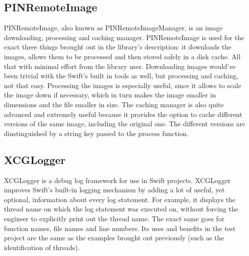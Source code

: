 \documentclass[a4paper,12pt]{article}
\begin{document}
\subsection{PINRemoteImage}
PINRemoteImage, also known as PINRemoteImageManager, is an image downloading, processing and caching manager.\cite{PINRemoteImage}
PINRemoteImage is used for the exact three things brought out in the library's description: it downloads the images,
allows them to be processed and then stored safely in a disk cache. All that with minimal
effort from the library user. Downloading images would've been trivial with the Swift's built in tools as well, but
processing and caching, not that easy. Processing the images is especially useful, since it allows to scale the image
down if necessary, which in turn makes the image smaller in dimensions and the file smaller in size. The caching
manager is also quite advanced and extremely useful because it provides the option to cache different versions of
the same image, including the original one. The different versions are dinstinguished by a string key passed to
the process function.

\subsection{XCGLogger}
XCGLogger is a debug log framework for use in Swift projects.\cite{XCGLogger} XCGLogger improves Swift's built-in
logging mechanism by adding a lot of useful, yet optional, information about every log statement. For example, it
displays the thread name on which the log statement was executed on, without forcing the engineer to explicitly print
out the thread name. The exact same goes for function names, file names and line numbers. Its uses and benefits in the
test project are the same as the examples brought out previously (such as the identification of threads).

\newpage
{}
{}
\listoffigures

\newpage
{}
{}


		
\end{document}
